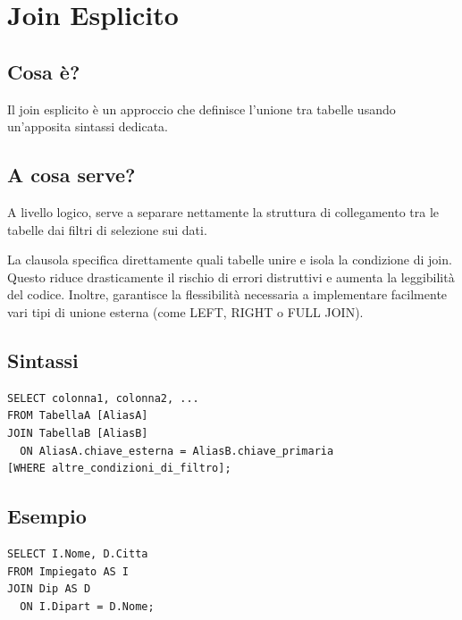 \section{Join Esplicito}
\subsection{Cosa è?}
Il join esplicito è un approccio che definisce l'unione tra tabelle usando un'apposita sintassi dedicata.
\subsection{A cosa serve?}
A livello logico, serve a separare nettamente la struttura di collegamento tra le tabelle dai filtri di selezione sui dati.

La clausola specifica direttamente quali tabelle unire e isola la condizione di join. Questo riduce drasticamente il rischio di errori distruttivi e aumenta la leggibilità del codice. Inoltre, garantisce la flessibilità necessaria a implementare facilmente vari tipi di unione esterna (come LEFT, RIGHT o FULL JOIN).
\subsection{Sintassi}
\begin{lstlisting}[language=sql_generic]
SELECT colonna1, colonna2, ...
FROM TabellaA [AliasA]
JOIN TabellaB [AliasB] 
  ON AliasA.chiave_esterna = AliasB.chiave_primaria
[WHERE altre_condizioni_di_filtro];
\end{lstlisting}
\subsection{Esempio}
\begin{lstlisting}[language=sql_generic]
SELECT I.Nome, D.Citta
FROM Impiegato AS I
JOIN Dip AS D 
  ON I.Dipart = D.Nome;
\end{lstlisting}